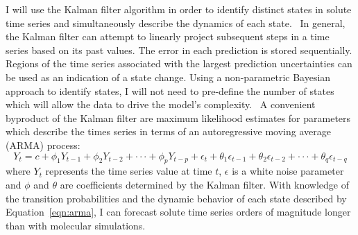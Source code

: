 \documentclass{article}
\begin{document}
  I will use the Kalman filter algorithm in order to identify distinct states
  in solute time series and simultaneously describe the dynamics of each state.~\cite{kalman_new_1960}
  In general, the Kalman filter can attempt to linearly project subsequent 
  steps in a time series based on its past values. The error in each prediction
  is stored sequentially. Regions of the time series associated with the 
  largest prediction uncertainties can be used as an indication of a state change.
  Using a non-parametric Bayesian approach to identify states, I will not need to 
  pre-define the number of states which will allow the data to drive the
  model's complexity.~\cite{lee_unraveling_2017} A convenient byproduct of the Kalman
  filter are maximum likelihood estimates for parameters which describe the times
  series in terms of an autoregressive moving average (ARMA) process:~\cite{hamilton_time_1994}
  \begin{equation}
  Y_t = c + \phi_1 Y_{t-1} + \phi_2 Y_{t-2} + \cdot\cdot\cdot + \phi_p Y_{t-p} + \epsilon_t + \theta_1\epsilon_{t-1} + \theta_2\epsilon_{t-2} + \cdot\cdot\cdot + \theta_q\epsilon_{t-q}
  \label{eqn:arma}
  \end{equation}
  where $Y_t$ represents the time series value at time $t$, $\epsilon$ is a white noise
  parameter and $\phi$ and $\theta$ are coefficients determined by the Kalman filter. 
  With knowledge of the transition probabilities and the dynamic behavior of each
  state described by Equation~\ref{eqn:arma}, I can forecast solute time series orders of 
  magnitude longer than with molecular simulations.
  
  
  
  
\end{document}
